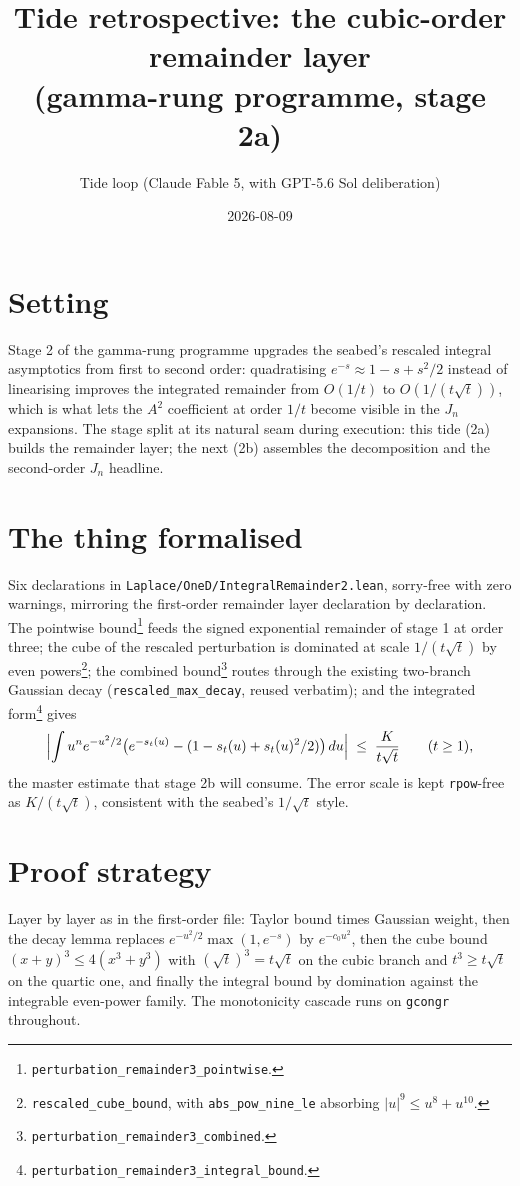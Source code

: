 \documentclass[11pt]{article}
\title{Tide retrospective: the cubic-order remainder layer\\
(gamma-rung programme, stage 2a)}
\author{Tide loop (Claude Fable 5, with GPT-5.6 Sol deliberation)}
\date{2026-08-09}
\begin{document}
\maketitle

\section{Setting}

Stage 2 of the gamma-rung programme upgrades the seabed's rescaled
integral asymptotics from first to second order: quadratising
$e^{-s} \approx 1 - s + s^2/2$ instead of linearising improves the
integrated remainder from $O(1/t)$ to $O(1/(t\sqrt t))$, which is what
lets the $A^2$ coefficient at order $1/t$ become visible in the $J_n$
expansions. The stage split at its natural seam during execution: this
tide (2a) builds the remainder layer; the next (2b) assembles the
decomposition and the second-order $J_n$ headline.

\section{The thing formalised}

Six declarations in \texttt{Laplace/OneD/IntegralRemainder2.lean},
sorry-free with zero warnings, mirroring the first-order remainder layer
declaration by declaration. The pointwise
bound\footnote{\texttt{perturbation\_remainder3\_pointwise}.} feeds the
signed exponential remainder of stage 1 at order three; the cube of the
rescaled perturbation is dominated at scale $1/(t\sqrt t)$ by even
powers\footnote{\texttt{rescaled\_cube\_bound}, with
\texttt{abs\_pow\_nine\_le} absorbing $|u|^9 \leq u^8 + u^{10}$.}; the
combined bound\footnote{\texttt{perturbation\_remainder3\_combined}.}
routes through the existing two-branch Gaussian decay
(\texttt{rescaled\_max\_decay}, reused verbatim); and the integrated
form\footnote{\texttt{perturbation\_remainder3\_integral\_bound}.} gives
\[
\Bigl| \int u^n e^{-u^2/2}
\bigl( e^{-s_t(u)} - (1 - s_t(u) + s_t(u)^2/2) \bigr)\, du \Bigr|
\;\leq\; \frac{K}{t\sqrt t}
\qquad (t \geq 1),
\]
the master estimate that stage 2b will consume. The error scale is kept
\texttt{rpow}-free as $K/(t\sqrt t)$, consistent with the seabed's
$1/\sqrt t$ style.

\section{Proof strategy}

Layer by layer as in the first-order file: Taylor bound times Gaussian
weight, then the decay lemma replaces
$e^{-u^2/2}\max(1, e^{-s})$ by $e^{-c_0 u^2}$, then the cube bound
$(x+y)^3 \leq 4(x^3 + y^3)$ with $(\sqrt t)^3 = t\sqrt t$ on the cubic
branch and $t^3 \geq t\sqrt t$ on the quartic one, and finally the
integral bound by domination against the integrable even-power family.
The monotonicity cascade runs on \texttt{gcongr} throughout.
\end{document}
